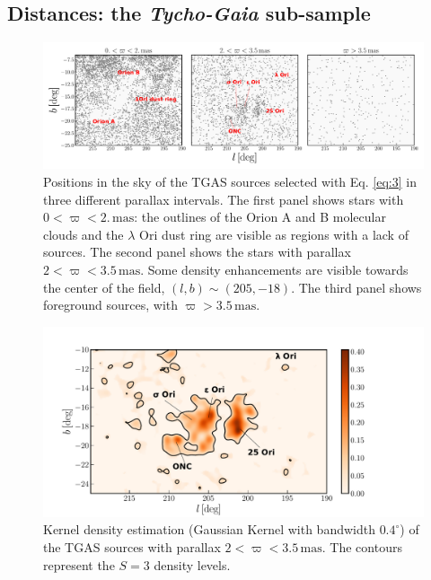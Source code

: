 \documentclass[onecolumn]{aa} %
\begin{document}
\subsection{Distances: the \textit{Tycho-Gaia} sub-sample}\label{sec:3.1}
\begin{figure}
\includegraphics[width = \textwidth, keepaspectratio]{fig3_labels.pdf}
\caption{Positions in the sky of the TGAS sources selected with Eq. \eqref{eq:3} in three different parallax intervals.
The first panel shows stars with  $0 < \varpi < 2. \, \mathrm{mas}$: the outlines of the Orion A and B molecular clouds and the $\lambda$ Ori dust ring are visible as regions with a lack of sources. The second panel shows the stars with parallax $ 2 < \varpi <3.5 \, \mathrm{mas}$. Some density enhancements are visible towards the center of the field, $(l, b) \sim (205, -18)$. The third panel shows foreground sources, with $\varpi > 3.5 \, \mathrm{mas}$.
} 
\label{fig:3}
\end{figure}
\begin{figure}
\includegraphics[width = \hsize, keepaspectratio]{fig4_small+labels.pdf}
\caption{Kernel density estimation (Gaussian Kernel with bandwidth $0.4^{\circ}$) of the TGAS sources with parallax $2 < \varpi < 3.5 \, \mathrm{mas}$.  The contours represent the $S = 3$ density levels.}
\label{fig:4}
\end{figure}
\end{document}
